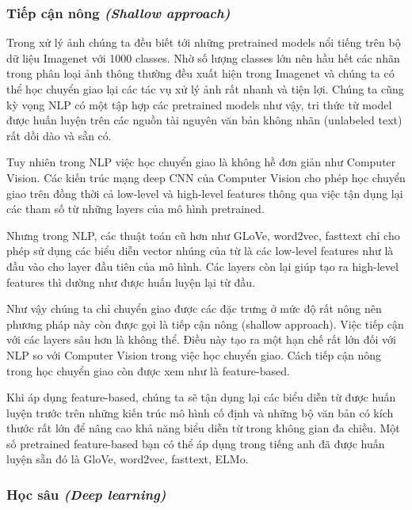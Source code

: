 \subsubsection{Tiếp cận nông \textit{(Shallow approach)}}
Trong xử lý ảnh chúng ta đều biết tới những pretrained models nổi tiếng trên bộ dữ liệu Imagenet với 1000 classes. Nhờ số lượng classes lớn nên hầu hết các nhãn trong phân loại ảnh thông thường đều xuất hiện trong Imagenet và chúng ta có thể học chuyển giao lại các tác vụ xử lý ảnh rất nhanh và tiện lợi. Chúng ta cũng kỳ vọng NLP có một tập hợp các pretrained models như vậy, tri thức từ model được huấn luyện trên các nguồn tài nguyên văn bản không nhãn (unlabeled text) rất dồi dào và sẵn có.

Tuy nhiên trong NLP việc học chuyển giao là không hề đơn giản như Computer Vision. Các kiến trúc mạng deep CNN của Computer Vision cho phép học chuyển giao trên đồng thời cả low-level và high-level features thông qua việc tận dụng lại các tham số từ những layers của mô hình pretrained.

Nhưng trong NLP, các thuật toán cũ hơn như GLoVe, word2vec, fasttext chỉ cho phép sử dụng các biểu diễn vector nhúng của từ là các low-level features như là đầu vào cho layer đầu tiên của mô hình. Các layers còn lại giúp tạo ra high-level features thì dường như được huấn luyện lại từ đầu.

Như vậy chúng ta chỉ chuyển giao được các đặc trưng ở mức độ rất nông nên phương pháp này còn được gọi là tiếp cận nông (shallow approach). Việc tiếp cận với các layers sâu hơn là không thể. Điều này tạo ra một hạn chế rất lớn đối với NLP so với Computer Vision trong việc học chuyển giao. Cách tiếp cận nông trong học chuyển giao còn được xem như là feature-based.

Khi áp dụng feature-based, chúng ta sẽ tận dụng lại các biểu diễn từ được huấn luyện trước trên những kiến trúc mô hình cố định và những bộ văn bản có kích thước rất lớn để nâng cao khả năng biểu diễn từ trong không gian đa chiều. Một số pretrained feature-based bạn có thể áp dụng trong tiếng anh đã được huấn luyện sẵn đó là GloVe, word2vec, fasttext, ELMo.

\subsubsection{Học sâu \textit{(Deep learning)}}

